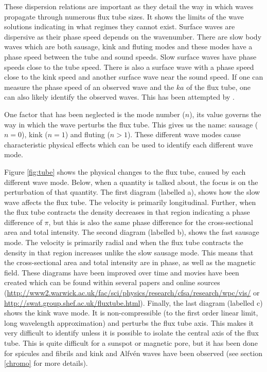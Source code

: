     These dispersion relations are important as they detail the way in which waves propagate through numerous flux tube sizes.
    It shows the limits of the wave solutions indicating in what regimes they cannot exist.
    Surface waves are dispersive as their phase speed depends on the wavenumber.
    There are slow body waves which are both sausage, kink and fluting modes and these modes have a phase speed between the tube and sound speeds.
    Slow surface waves have phase speeds close to the tube speed. 
    There is also a surface wave with a phase speed close to the kink speed and another surface wave near the sound speed.
    If one can measure the phase speed of an observed wave and the $ka$ of the flux tube, one can also likely identify the observed waves.
    This has been attempted by \cite{2015A&A...579A..73M}.
    
    One factor that has been neglected is the mode number ($n$), its value governs the way in which the wave perturbs the flux tube.
    This gives us the name: sausage ($n=0$), kink ($n=1$) and fluting ($n>1$).
    These different wave modes cause characteristic physical effects which can be used to identify each different wave mode.
    
    Figure \ref{fig:tube} shows the physical changes to the flux tube, caused by each different wave mode.
    Below, when a quantity is talked about, the focus is on the perturbation of that quantity.
    The first diagram (labelled a), shows how the slow wave affects the flux tube. 
    The velocity is primarily longitudinal.
    Further, when the flux tube contracts the density decreases in that region indicating a phase difference of $\pi$, but this is also the same phase difference for the cross-sectional area and total intensity.
    The second diagram (labelled b), shows the fast sausage mode.
    The velocity is primarily radial and when the flux tube contracts the density in that region increases unlike the slow sausage mode.
    This means that the cross-sectional area and total intensity are in phase, as well as the magnetic field.
    These diagrams have been improved over time and movies have been created which can be found within several papers \citep{Morton2012,jess2015multiwavelength} and online sources (\url{http://www2.warwick.ac.uk/fac/sci/physics/research/cfsa/research/wpc/vis/} or \url{http://swat.group.shef.ac.uk/fluxtube.html}).
    Finally, the last diagram (labelled c) shows the kink wave mode.
    It is non-compressible (to the first order linear limit, long wavelength approximation) and perturbs the flux tube axis.
    This makes it very difficult to identify unless it is possible to isolate the central axis of the flux tube.
    This is quite difficult for a sunspot or magnetic pore, but it has been done for spicules and fibrils and  kink and Alfv\'en waves have been observed (see section \ref{chromo} for more details).
    
